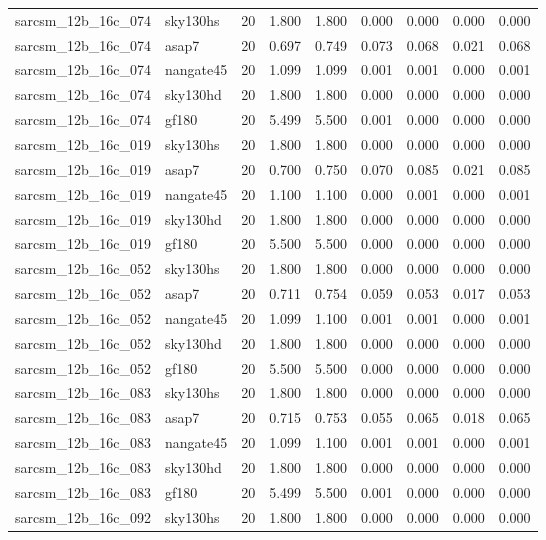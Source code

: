 \begin{tabular}{llrrrrrrr}
sarcsm\_12b\_16c\_074 & sky130hs & 20 & 1.800 & 1.800 & 0.000 & 0.000 & 0.000 & 0.000 \\
sarcsm\_12b\_16c\_074 & asap7 & 20 & 0.697 & 0.749 & 0.073 & 0.068 & 0.021 & 0.068 \\
sarcsm\_12b\_16c\_074 & nangate45 & 20 & 1.099 & 1.099 & 0.001 & 0.001 & 0.000 & 0.001 \\
sarcsm\_12b\_16c\_074 & sky130hd & 20 & 1.800 & 1.800 & 0.000 & 0.000 & 0.000 & 0.000 \\
sarcsm\_12b\_16c\_074 & gf180 & 20 & 5.499 & 5.500 & 0.001 & 0.000 & 0.000 & 0.000 \\
sarcsm\_12b\_16c\_019 & sky130hs & 20 & 1.800 & 1.800 & 0.000 & 0.000 & 0.000 & 0.000 \\
sarcsm\_12b\_16c\_019 & asap7 & 20 & 0.700 & 0.750 & 0.070 & 0.085 & 0.021 & 0.085 \\
sarcsm\_12b\_16c\_019 & nangate45 & 20 & 1.100 & 1.100 & 0.000 & 0.001 & 0.000 & 0.001 \\
sarcsm\_12b\_16c\_019 & sky130hd & 20 & 1.800 & 1.800 & 0.000 & 0.000 & 0.000 & 0.000 \\
sarcsm\_12b\_16c\_019 & gf180 & 20 & 5.500 & 5.500 & 0.000 & 0.000 & 0.000 & 0.000 \\
sarcsm\_12b\_16c\_052 & sky130hs & 20 & 1.800 & 1.800 & 0.000 & 0.000 & 0.000 & 0.000 \\
sarcsm\_12b\_16c\_052 & asap7 & 20 & 0.711 & 0.754 & 0.059 & 0.053 & 0.017 & 0.053 \\
sarcsm\_12b\_16c\_052 & nangate45 & 20 & 1.099 & 1.100 & 0.001 & 0.001 & 0.000 & 0.001 \\
sarcsm\_12b\_16c\_052 & sky130hd & 20 & 1.800 & 1.800 & 0.000 & 0.000 & 0.000 & 0.000 \\
sarcsm\_12b\_16c\_052 & gf180 & 20 & 5.500 & 5.500 & 0.000 & 0.000 & 0.000 & 0.000 \\
sarcsm\_12b\_16c\_083 & sky130hs & 20 & 1.800 & 1.800 & 0.000 & 0.000 & 0.000 & 0.000 \\
sarcsm\_12b\_16c\_083 & asap7 & 20 & 0.715 & 0.753 & 0.055 & 0.065 & 0.018 & 0.065 \\
sarcsm\_12b\_16c\_083 & nangate45 & 20 & 1.099 & 1.100 & 0.001 & 0.001 & 0.000 & 0.001 \\
sarcsm\_12b\_16c\_083 & sky130hd & 20 & 1.800 & 1.800 & 0.000 & 0.000 & 0.000 & 0.000 \\
sarcsm\_12b\_16c\_083 & gf180 & 20 & 5.499 & 5.500 & 0.001 & 0.000 & 0.000 & 0.000 \\
sarcsm\_12b\_16c\_092 & sky130hs & 20 & 1.800 & 1.800 & 0.000 & 0.000 & 0.000 & 0.000 \\

\end{tabular}
